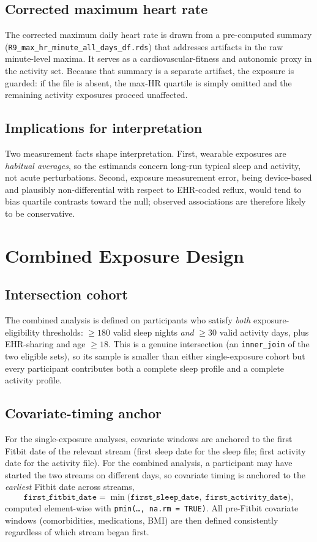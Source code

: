 \documentclass[11pt]{article}
\newcommand{\code}[1]{\texttt{\small #1}}
\begin{document}
\subsection{Corrected maximum heart rate}
The corrected maximum daily heart rate is drawn from a pre-computed summary
(\code{R9_max_hr_minute_all_days_df.rds}) that addresses artifacts in the raw minute-level maxima. It
serves as a cardiovascular-fitness and autonomic proxy in the activity set. Because that summary is a
separate artifact, the exposure is guarded: if the file is absent, the max-HR quartile is simply omitted
and the remaining activity exposures proceed unaffected.

\subsection{Implications for interpretation}
Two measurement facts shape interpretation. First, wearable exposures are \emph{habitual averages}, so
the estimands concern long-run typical sleep and activity, not acute perturbations. Second, exposure
measurement error, being device-based and plausibly non-differential with respect to EHR-coded reflux,
would tend to bias quartile contrasts toward the null; observed associations are therefore likely to be
conservative.

\section{Combined Exposure Design}

\subsection{Intersection cohort}
The combined analysis is defined on participants who satisfy \emph{both} exposure-eligibility
thresholds: $\geq 180$ valid sleep nights \emph{and} $\geq 30$ valid activity days, plus EHR-sharing
and age $\geq 18$. This is a genuine intersection (an \code{inner_join} of the two eligible sets), so
its sample is smaller than either single-exposure cohort but every participant contributes both a
complete sleep profile and a complete activity profile.

\subsection{Covariate-timing anchor}
For the single-exposure analyses, covariate windows are anchored to the first Fitbit date of the
relevant stream (first sleep date for the sleep file; first activity date for the activity file). For
the combined analysis, a participant may have started the two streams on different days, so covariate
timing is anchored to the \emph{earliest} Fitbit date across streams,
\[
\texttt{first\_fitbit\_date} = \min\!\big(\texttt{first\_sleep\_date},\; \texttt{first\_activity\_date}\big),
\]
computed element-wise with \code{pmin(\ldots, na.rm = TRUE)}. All pre-Fitbit covariate windows
(comorbidities, medications, BMI) are then defined consistently regardless of which stream began first.
\end{document}
